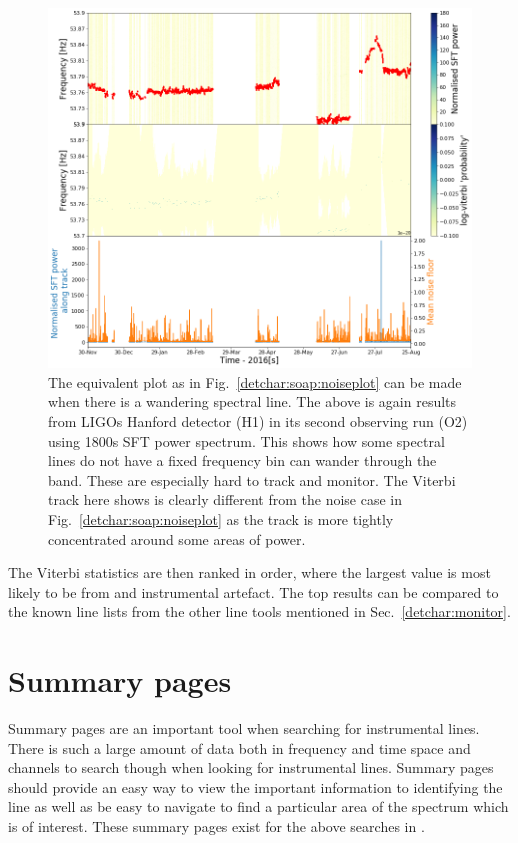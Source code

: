 \begin{figure}
	\centering
	\includegraphics[width=\textwidth]{C5_detchar/track_F53_7_53_9_wander.png}
	\caption{The equivalent plot as in Fig.~\ref{detchar:soap:noiseplot} can be made when there is a wandering spectral line. The above is again results from \acp{LIGO} Hanford detector (H1) in its second observing run (O2) using 1800s \ac{SFT} power spectrum. This shows how some spectral lines do not have a fixed frequency bin can wander through the band. These are especially hard to track and monitor. The Viterbi track here shows is clearly different from the noise case in Fig.~\ref{detchar:soap:noiseplot} as the track is more tightly concentrated around some areas of power. }
	\label{detchar:soap:wanderplot}
\end{figure}

The Viterbi statistics are then ranked in order, where the largest value is most likely to be from and instrumental artefact. 
The top results can be compared to the known line lists from the other line tools mentioned in Sec.~\ref{detchar:monitor}.


\section{\label{detchar:summary}Summary pages}

Summary pages are an important tool when searching for instrumental lines. 
There is such a large amount of data both in frequency and time space and channels to search though when looking for instrumental lines.
Summary pages should provide an easy way to view the important information to identifying the line as well as be easy to navigate to find a particular area of the spectrum which is of interest. 
These summary pages exist for the above searches in \citep{line summary pages}.


